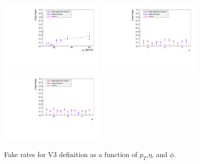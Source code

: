 \begin{figure}[!htbp]
\begin{center}
\includegraphics[width=0.45\textwidth]{figures/ElectronFakeRate_DenominatorV3_ptThreshold15_Pt.pdf}
\includegraphics[width=0.45\textwidth]{figures/ElectronFakeRate_DenominatorV3_ptThreshold15_Eta.pdf}
\includegraphics[width=0.45\textwidth]{figures/ElectronFakeRate_DenominatorV3_ptThreshold15_Phi.pdf}
\caption{Fake rates for V3 definition as a function of $p_T$,$\eta$, and $\phi$.}
\label{fig:ele_fr_V3_jet15}
\end{center}
\end{figure}

